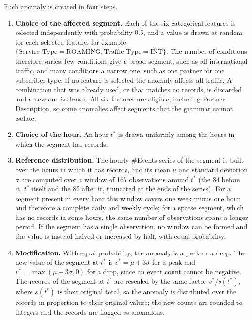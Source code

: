Each anomaly is created in four steps.
\begin{enumerate}
    \item \textbf{Choice of the affected segment.}
    Each of the six categorical features is selected independently with probability 0.5, and a value is drawn at random for each selected feature, for example $\{\text{Service Type} = \text{ROAMING}, \text{Traffic Type} = \text{INT}\}$.
    The number of conditions therefore varies: few conditions give a broad segment, such as all international traffic, and many conditions a narrow one, such as one partner for one subscriber type.
    If no feature is selected the anomaly affects all traffic.
    A combination that was already used, or that matches no records, is discarded and a new one is drawn.
    All six features are eligible, including Partner Description, so some anomalies affect segments that the grammar cannot isolate.

    \item \textbf{Choice of the hour.}
    An hour $t^{*}$ is drawn uniformly among the hours in which the segment has records.

    \item \textbf{Reference distribution.}
    The hourly \#Events series of the segment is built over the hours in which it has records, and its mean $\mu$ and standard deviation $\sigma$ are computed over a window of 167 observations around $t^{*}$ (the 84 before it, $t^{*}$ itself and the 82 after it, truncated at the ends of the series).
    For a segment present in every hour this window covers one week minus one hour and therefore a complete daily and weekly cycle; for a sparse segment, which has no records in some hours, the same number of observations spans a longer period.
    If the segment has a single observation, no window can be formed and the value is instead halved or increased by half, with equal probability.

    \item \textbf{Modification.}
    With equal probability, the anomaly is a peak or a drop.
    The new value of the segment at $t^{*}$ is $v^{*} = \mu + 3\sigma$ for a peak and $v^{*} = \max(\mu - 3\sigma, 0)$ for a drop, since an event count cannot be negative.
    The records of the segment at $t^{*}$ are rescaled by the same factor $v^{*}/s(t^{*})$, where $s(t^{*})$ is their original total, so the anomaly is distributed over the records in proportion to their original values; the new counts are rounded to integers and the records are flagged as anomalous.
\end{enumerate}

